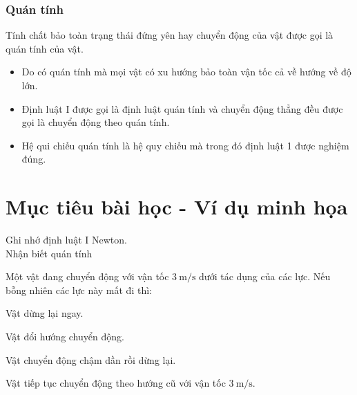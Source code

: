 \subsubsection{Quán tính}
Tính chất bảo toàn trạng thái đứng yên hay chuyển động của vật được gọi là quán tính của vật.
\begin{itemize}
	\item Do có quán tính mà mọi vật có xu hướng bảo toàn vận tốc cả về hướng về độ lớn.
	\item Định luật I được gọi là định luật quán tính và chuyển động thẳng đều được gọi là chuyển động theo quán tính.
	\item Hệ qui chiếu quán tính là hệ quy chiếu mà trong đó định luật 1 được nghiệm đúng. 
\end{itemize}
\section{Mục tiêu bài học - Ví dụ minh họa}
\begin{dang}{Ghi nhớ định luật I Newton. \\ Nhận biết quán tính}
	{Một vật đang chuyển động với vận tốc $\SI{3}{\meter/\second}$ dưới tác dụng của các lực. Nếu bỗng nhiên các lực này mất đi thì:
	\begin{mcq}
		\item Vật dừng lại ngay.
		\item Vật đổi hướng chuyển động.
		\item Vật chuyển động chậm dần rồi dừng lại.
		\item Vật tiếp tục chuyển động theo hướng cũ với vận tốc $\SI{3}{\meter/\second}$.
\end{mcq}}
	{}

	{}
\end{dang}	
